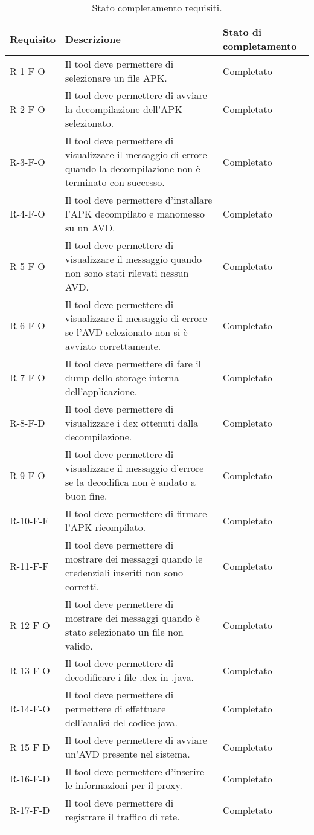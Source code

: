 \begin{longtable}{| C{3cm}|C{7cm} |C{3cm}|}
    \hline
    \textbf{Requisito} & \textbf{Descrizione}& \textbf{Stato di completamento} \\\hline
    R-1-F-O& Il tool deve permettere di selezionare un file APK. & Completato                      \\\hline
    R-2-F-O & Il tool deve permettere di avviare la decompilazione dell'APK selezionato.
    & Completato \\\hline
    R-3-F-O & Il tool deve permettere di visualizzare il messaggio di errore quando la decompilazione non è terminato con successo.
    & Completato \\\hline
    R-4-F-O & Il tool deve permettere d'installare l'APK decompilato e manomesso su un AVD.
    & Completato \\\hline
    R-5-F-O & Il tool deve permettere di visualizzare il messaggio quando non sono stati rilevati nessun AVD.
    & Completato \\\hline
    R-6-F-O & Il tool deve permettere di visualizzare il messaggio di errore se l'AVD selezionato non si è avviato correttamente.
    & Completato \\\hline
    R-7-F-O & Il tool deve permettere di fare il dump dello storage interna dell'applicazione.
    & Completato \\\hline
    R-8-F-D & Il tool deve permettere di visualizzare i dex ottenuti dalla decompilazione.
    & Completato \\\hline
    R-9-F-O & Il tool deve permettere di visualizzare il messaggio d'errore se la decodifica non è andato a buon fine.
    & Completato \\\hline
    R-10-F-F & Il tool deve permettere di firmare l'APK ricompilato.
    & Completato \\\hline
    R-11-F-F & Il tool deve permettere di mostrare dei messaggi quando le credenziali inseriti non sono corretti.
    & Completato \\\hline
    R-12-F-O & Il tool deve permettere di mostrare dei messaggi quando è stato selezionato un file non valido.
    & Completato \\\hline
    R-13-F-O & Il tool deve permettere di decodificare i file .dex in .java.
    & Completato \\\hline
    R-14-F-O & Il tool deve permettere di permettere di effettuare dell'analisi del codice java.
    & Completato \\\hline
    R-15-F-D & Il tool deve permettere di avviare un'AVD presente nel sistema.
    & Completato \\\hline
    R-16-F-D & Il tool deve permettere d'inserire le informazioni per il proxy.
    & Completato \\\hline
    R-17-F-D & Il tool deve permettere di registrare il traffico di rete.
    & Completato \\\hline
    \caption{Stato completamento requisiti.}
\end{longtable}